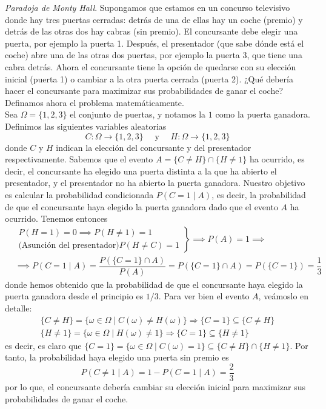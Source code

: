 \begin{ejemplo}
    \textit{Paradoja de Monty Hall}. Supongamos que estamos en un concurso televisivo donde hay tres puertas cerradas: detrás de una de ellas hay un coche (premio) y detrás de las otras dos hay cabras (sin premio). El concursante debe elegir una puerta, por ejemplo la puerta 1. Después, el presentador (que sabe dónde está el coche) abre una de las otras dos puertas, por ejemplo la puerta 3, que tiene una cabra detrás. Ahora el concursante tiene la opción de quedarse con su elección inicial (puerta 1) o cambiar a la otra puerta cerrada (puerta 2). ¿Qué debería hacer el concursante para maximizar sus probabilidades de ganar el coche? Definamos ahora el problema matemáticamente. \\
    \noindent
    Sea $\Omega = \{1, 2, 3\}$ el conjunto de puertas, y notamos la $1$ como la puerta ganadora. Definimos las siguientes variables aleatorias
    \begin{equation*}
        C: \Omega \to \{1,2,3\} \quad \text{ y } \quad H: \Omega \to \{1,2,3\} 
    \end{equation*}
    donde $C$ y $H$ indican la elección del concursante y del presentador respectivamente. Sabemos que el evento $A=\{C\neq H\} \cap \{H\neq 1\}$ ha ocurrido, es decir, el concursante ha elegido una puerta distinta a la que ha abierto el presentador, y el presentador no ha abierto la puerta ganadora. Nuestro objetivo es calcular la probabilidad condicionada $P(C=1 \mid A)$, es decir, la probabilidad de que el concursante haya elegido la puerta ganadora dado que el evento $A$ ha ocurrido. Tenemos entonces 
    \begin{align*}
        & \left.\begin{array}{ll}
            P(H=1)=0 \implies P(H\neq 1)=1 \\
            \text{(Asunción del presentador)} P(H\neq C)=1 
        \end{array}\right\} \implies P(A)=1 \implies \\
        & \implies P(C=1 \mid A)=\dfrac{P(\{C=1\} \cap A)}{P(A)}=P(\{C=1\} \cap A) = P(\{C=1\})=\dfrac{1}{3}
    \end{align*}
    donde hemos obtenido que la probabilidad de que el concursante haya elegido la puerta ganadora desde el principio es $1/3$. Para ver bien el evento $A$, veámoslo en detalle:
    \begin{align*}
        \{C \neq H\} = \{ \omega \in \Omega \mid C(\omega) \neq H(\omega) \} \Longrightarrow \{C=1\}\subseteq \{C\neq H\} \\
        \{H \neq 1\} = \{ \omega \in \Omega \mid H(\omega) \neq 1 \} \Longrightarrow \{C=1\}\subseteq \{H \neq 1\}
    \end{align*}
    es decir, es claro que $\{C= 1\}=\{\omega\in \Omega \mid C(\omega) = 1\}\subseteq \{C\neq H\} \cap \{H\neq 1\}$. Por tanto, la probabilidad haya elegido una puerta sin premio es 
    $$P(C\neq 1 \mid A)=1-P(C=1 \mid A)=\dfrac{2}{3}$$
    por lo que, el concursante debería cambiar su elección inicial para maximizar sus probabilidades de ganar el coche.
\end{ejemplo}

